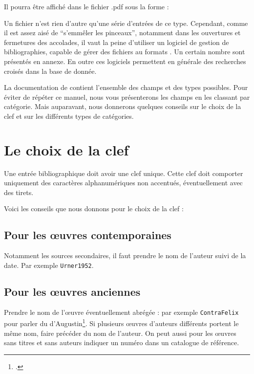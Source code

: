 Il pourra être affiché dans le fichier .pdf sous la forme :

\begin{quotation}
\cite{Urner1952}
\end{quotation}



Un fichier  n'est rien d'autre qu'une  série d'entrées de ce type. Cependant, comme il est assez aisé de \enquote{s'emmêler les pinceaux}, notamment dans les ouvertures et fermetures des accolades, il vaut la peine d'utiliser un logiciel de gestion de bibliographies, capable de gérer  des fichiers au formats . Un certain nombre sont présentés en annexe. En outre ces logiciels permettent en générale des recherches croisés dans la base de donnée.

La documentation de  contient l'ensemble des champs et des types possibles. Pour éviter de répéter ce manuel, nous vous présenterons les champs en les classant par catégorie. Mais auparavant, nous donnerons quelques conseils sur le choix de la clef et sur les différents types de catégories.

\section{Le choix de la clef}

Une entrée bibliographique doit avoir une clef unique. Cette clef doit comporter uniquement des caractères alphanumériques non accentués, éventuellement avec des tirets. 




Voici les conseils que nous donnons pour le choix de la clef :
\subsection{Pour les œuvres contemporaines}
Notamment les sources secondaires, il faut prendre le nom de l'auteur suivi de la date. Par exemple \verb|Urner1952|.

\subsection{Pour les œuvres anciennes}

Prendre le nom de l'œuvre  éventuellement abrégée : par exemple \verb|ContraFelix| pour parler du  d'Augustin\footcite{ContraFelix}. Si plusieurs œuvres d'auteurs différents portent le même nom, faire précéder du nom de l'auteur. On peut aussi pour les œuvres sans titres et sans auteurs indiquer un numéro dans un catalogue de référence.



